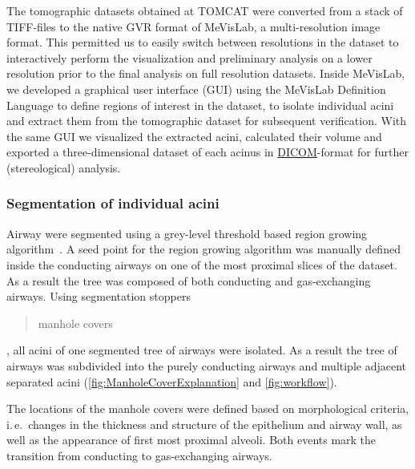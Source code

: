 \documentclass[final,paper=a4,DIV=calc,abstract,english]{scrartcl}
\newcommand{\ie}{i.\,e.\ }
\begin{document}
The tomographic datasets obtained at TOMCAT were converted from a stack of TIFF-files to the native GVR format of MeVisLab, a multi-resolution  image format.
This permitted us to easily switch between resolutions in the dataset to interactively perform the visualization and preliminary analysis on a lower resolution prior to the final analysis on full resolution datasets.
Inside MeVisLab, we developed a graphical user interface (GUI) using the MeVisLab Definition Language to define regions of interest in the dataset, to isolate individual acini and extract them from the tomographic dataset for subsequent verification.
With the same GUI we visualized the extracted acini, calculated their volume and exported a three-dimensional dataset of each acinus in \href{http://en.wikipedia.org/w/index.php?title=DICOM&oldid=511155074}{DICOM}-format for further (stereological) analysis.

\subsubsection{Segmentation of individual acini}
\label{sec:manhole covers}
Airway  were segmented using a grey-level threshold based region growing algorithm~\citep{Zucker1976}.
A seed point for the region growing algorithm was manually defined inside the conducting airways on one of the most proximal slices of the dataset.
As a result the tree was composed of both conducting and gas-exchanging airways.
Using segmentation stoppers \blockquote{manhole covers}, all acini of one segmented tree of airways were isolated.
As a result the tree of airways was subdivided into the purely conducting airways and multiple adjacent separated acini (\autoref{fig:ManholeCoverExplanation} and \ref{fig:workflow}).

The locations of the manhole covers were defined based on morphological criteria, \ie changes in the thickness and structure of the epithelium and airway wall, as well as the appearance of first most proximal alveoli.
Both events mark the transition from conducting to gas-exchanging airways.
\end{document}
